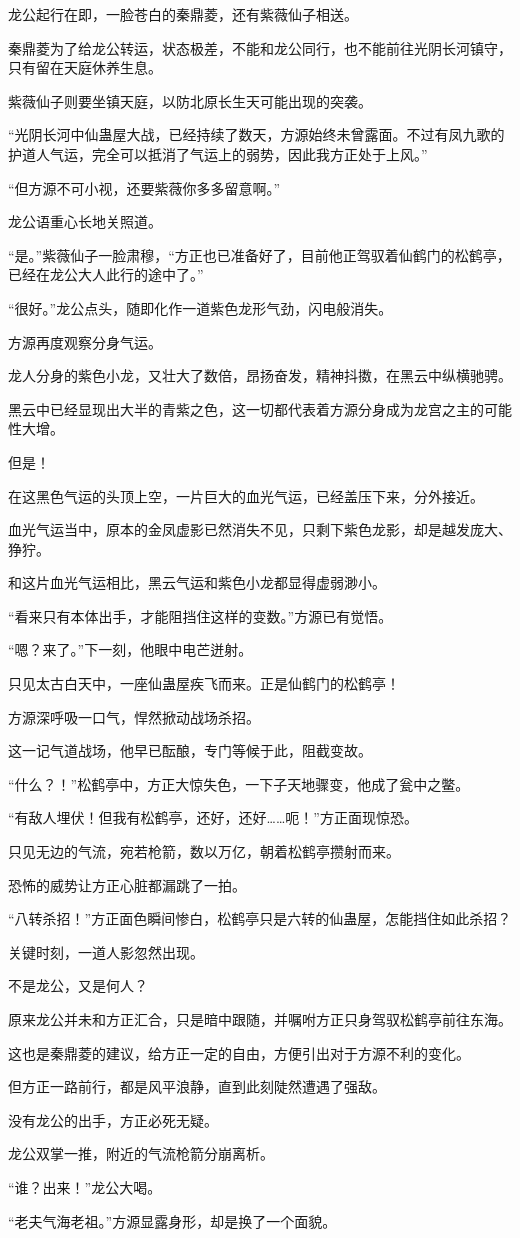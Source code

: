 \begin{this_body}
龙公起行在即，一脸苍白的秦鼎菱，还有紫薇仙子相送。

秦鼎菱为了给龙公转运，状态极差，不能和龙公同行，也不能前往光阴长河镇守，只有留在天庭休养生息。

紫薇仙子则要坐镇天庭，以防北原长生天可能出现的突袭。

“光阴长河中仙蛊屋大战，已经持续了数天，方源始终未曾露面。不过有凤九歌的护道人气运，完全可以抵消了气运上的弱势，因此我方正处于上风。”

“但方源不可小视，还要紫薇你多多留意啊。”

龙公语重心长地关照道。

“是。”紫薇仙子一脸肃穆，“方正也已准备好了，目前他正驾驭着仙鹤门的松鹤亭，已经在龙公大人此行的途中了。”

“很好。”龙公点头，随即化作一道紫色龙形气劲，闪电般消失。

方源再度观察分身气运。

龙人分身的紫色小龙，又壮大了数倍，昂扬奋发，精神抖擞，在黑云中纵横驰骋。

黑云中已经显现出大半的青紫之色，这一切都代表着方源分身成为龙宫之主的可能性大增。

但是！

在这黑色气运的头顶上空，一片巨大的血光气运，已经盖压下来，分外接近。

血光气运当中，原本的金凤虚影已然消失不见，只剩下紫色龙影，却是越发庞大、狰狞。

和这片血光气运相比，黑云气运和紫色小龙都显得虚弱渺小。

“看来只有本体出手，才能阻挡住这样的变数。”方源已有觉悟。

“嗯？来了。”下一刻，他眼中电芒迸射。

只见太古白天中，一座仙蛊屋疾飞而来。正是仙鹤门的松鹤亭！

方源深呼吸一口气，悍然掀动战场杀招。

这一记气道战场，他早已酝酿，专门等候于此，阻截变故。

“什么？！”松鹤亭中，方正大惊失色，一下子天地骤变，他成了瓮中之鳖。

“有敌人埋伏！但我有松鹤亭，还好，还好……呃！”方正面现惊恐。

只见无边的气流，宛若枪箭，数以万亿，朝着松鹤亭攒射而来。

恐怖的威势让方正心脏都漏跳了一拍。

“八转杀招！”方正面色瞬间惨白，松鹤亭只是六转的仙蛊屋，怎能挡住如此杀招？

关键时刻，一道人影忽然出现。

不是龙公，又是何人？

原来龙公并未和方正汇合，只是暗中跟随，并嘱咐方正只身驾驭松鹤亭前往东海。

这也是秦鼎菱的建议，给方正一定的自由，方便引出对于方源不利的变化。

但方正一路前行，都是风平浪静，直到此刻陡然遭遇了强敌。

没有龙公的出手，方正必死无疑。

龙公双掌一推，附近的气流枪箭分崩离析。

“谁？出来！”龙公大喝。

“老夫气海老祖。”方源显露身形，却是换了一个面貌。

\end{this_body}

